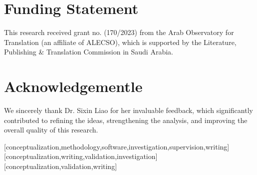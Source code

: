 \documentclass[english]{textolivre}
\begin{document}
\begin{polyabstract}
\begin{portuguese}
\begin{abstract}
\end{abstract}
\end{portuguese}

\end{polyabstract}








\printbibliography\label{sec-bib}

\section*{Funding Statement}

This research received grant no. (170/2023) from the Arab Observatory for Translation (an affiliate of ALECSO), which is supported by the Literature, Publishing \& Translation Commission in Saudi Arabia.

\section*{Acknowledgementle}

We sincerely thank Dr. Sixin Liao for her invaluable feedback, which significantly contributed to refining the ideas, strengthening the analysis, and improving the overall quality of this research.  

\begin{contributors}
	
[conceptualization,methodology,software,investigation,supervision,writing]
[conceptualization,writing,validation,investigation]
[conceptualization,validation,writing]
\end{contributors}
\end{document}
